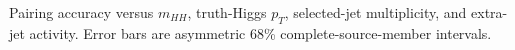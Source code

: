 Pairing accuracy versus $m_{HH}$, truth-Higgs $p_T$, selected-jet multiplicity, and extra-jet activity. Error bars are asymmetric 68\% complete-source-member intervals.
